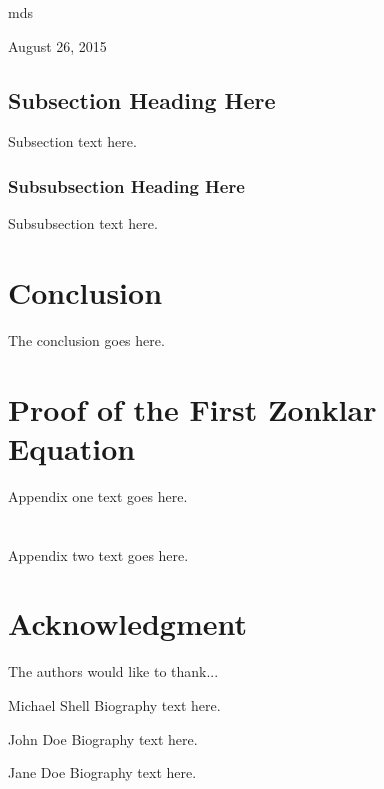 \documentclass[journal,transmag]{IEEEtran}
\begin{document}
\hfill mds
 
\hfill August 26, 2015

\subsection{Subsection Heading Here}
Subsection text here.



\subsubsection{Subsubsection Heading Here}
Subsubsection text here.


















\section{Conclusion}
The conclusion goes here.










\appendices
\section{Proof of the First Zonklar Equation}
Appendix one text goes here.

\section{}
Appendix two text goes here.


\section*{Acknowledgment}


The authors would like to thank...


\ifCLASSOPTIONcaptionsoff
  \newpage
\fi










\begin{IEEEbiography}{Michael Shell}
Biography text here.
\end{IEEEbiography}

\begin{IEEEbiographynophoto}{John Doe}
Biography text here.
\end{IEEEbiographynophoto}



\begin{IEEEbiographynophoto}{Jane Doe}
Biography text here.
\end{IEEEbiographynophoto}
\end{document}
